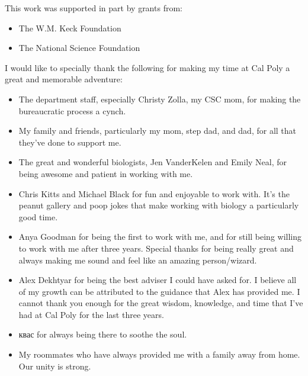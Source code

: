 \documentclass[12pt]{ucthesis}
\begin{document}
\begin{frontmatter}
   \begin{acknowledgements}
      This work was supported in part by grants from:
      \begin{itemize}
         \item The W.M. Keck Foundation
         \item The National Science Foundation
      \end{itemize}
      I would like to specially thank the following for making my time at Cal
      Poly a great and memorable adventure:
      \begin{itemize}
         \item The department staff, especially Christy Zolla, my CSC mom, for
               making the bureaucratic process a cynch.
         \item My family and friends, particularly my mom, step dad,
               and dad, for all that they've done to support me.
         \item The great and wonderful biologists, Jen VanderKelen and Emily
               Neal, for being awesome and patient in working with me.
         \item Chris Kitts and Michael Black for fun and enjoyable to work
               with. It's the peanut gallery and poop jokes that make working
               with biology a particularly good time.
         \item Anya Goodman for being the first to work with me, and for still
               being willing to work with me after three years. Special thanks
               for being really great and always making me sound and feel like
               an amazing person/wizard.
         \item Alex Dekhtyar for being the best adviser I could have asked for.
               I believe all of my growth can be attributed to the guidance
               that Alex has provided me. I cannot thank you enough for the
               great wisdom, knowledge, and time that I've had at Cal Poly for
               the last three years.
         \item \foreignlanguage{russian}{квас} for always being there to soothe
               the soul.
         \item My roommates who have always provided me with a family away from
               home. Our unity is strong.
      \end{itemize}
   \end{acknowledgements}

   \tableofcontents

   \listoftables
   \listoffigures
\end{frontmatter}
\end{document}
